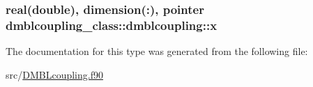 \hypertarget{structdmblcoupling__class_1_1dmblcoupling_a4f3f155bd46c7ed8e0f3f5fe8447e94d}{
\subsubsection[{x}]{\setlength{\rightskip}{0pt plus 5cm}real(double), dimension(\+:), pointer dmblcoupling\+\_\+class\+::dmblcoupling\+::x\hspace{0.3cm}{\ttfamily [private]}}}\label{structdmblcoupling__class_1_1dmblcoupling_a4f3f155bd46c7ed8e0f3f5fe8447e94d}


The documentation for this type was generated from the following file\+:\begin{DoxyCompactItemize}
\item 
src/\hyperlink{_d_m_b_lcoupling_8f90}{D\+M\+B\+Lcoupling.\+f90}\end{DoxyCompactItemize}
